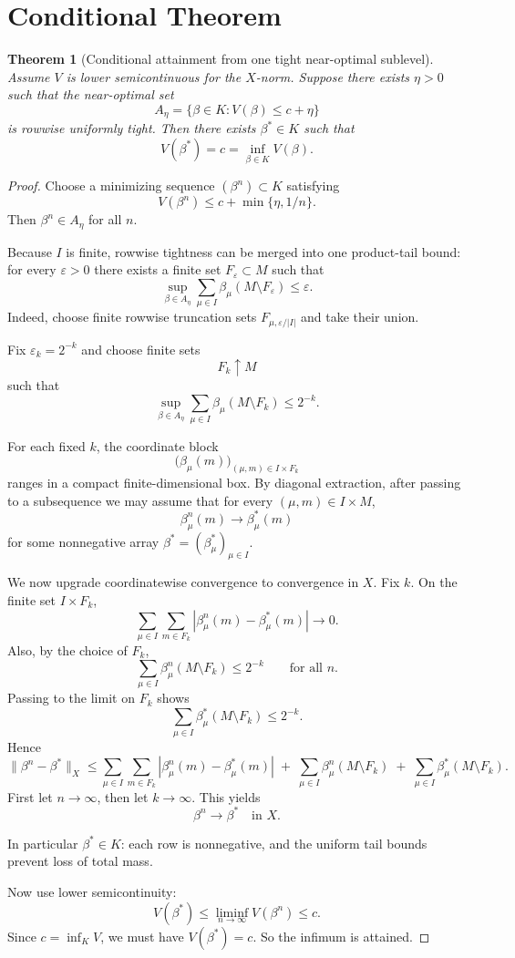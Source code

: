 \documentclass[12pt]{article}
\newtheorem{theorem}{Theorem}
\begin{document}
\section{Conditional Theorem}

\begin{theorem}[Conditional attainment from one tight near-optimal sublevel]
\label{thm:attainment}
Assume $V$ is lower semicontinuous for the $X$-norm.
Suppose there exists $\eta > 0$ such that the near-optimal set
\[
A_\eta = \{ \beta \in K : V(\beta) \le c + \eta \}
\]
is rowwise uniformly tight.
Then there exists $\beta^* \in K$ such that
\[
V(\beta^*) = c = \inf_{\beta \in K} V(\beta).
\]
\end{theorem}

\begin{proof}
Choose a minimizing sequence $(\beta^n) \subset K$ satisfying
\[
V(\beta^n) \le c + \min\{\eta, 1/n\}.
\]
Then $\beta^n \in A_\eta$ for all $n$.

Because $I$ is finite, rowwise tightness can be merged into one product-tail bound:
for every $\varepsilon > 0$ there exists a finite set $F_\varepsilon \subset M$ such that
\[
\sup_{\beta \in A_\eta} \sum_{\mu \in I} \beta_\mu(M \setminus F_\varepsilon) \le \varepsilon.
\]
Indeed, choose finite rowwise truncation sets $F_{\mu,\varepsilon/|I|}$ and take their union.

Fix $\varepsilon_k = 2^{-k}$ and choose finite sets
\[
F_k \uparrow M
\]
such that
\[
\sup_{\beta \in A_\eta} \sum_{\mu \in I} \beta_\mu(M \setminus F_k) \le 2^{-k}.
\]

For each fixed $k$, the coordinate block
\[
\big(\beta_\mu(m)\big)_{(\mu,m)\in I\times F_k}
\]
ranges in a compact finite-dimensional box.
By diagonal extraction, after passing to a subsequence we may assume that for every $(\mu,m) \in I \times M$,
\[
\beta^n_\mu(m) \to \beta^*_\mu(m)
\]
for some nonnegative array $\beta^* = (\beta^*_\mu)_{\mu \in I}$.

We now upgrade coordinatewise convergence to convergence in $X$.
Fix $k$.
On the finite set $I \times F_k$,
\[
\sum_{\mu \in I}\sum_{m \in F_k} |\beta^n_\mu(m)-\beta^*_\mu(m)| \to 0.
\]
Also, by the choice of $F_k$,
\[
\sum_{\mu \in I}\beta^n_\mu(M \setminus F_k) \le 2^{-k}
\qquad\text{for all } n.
\]
Passing to the limit on $F_k$ shows
\[
\sum_{\mu \in I}\beta^*_\mu(M \setminus F_k) \le 2^{-k}.
\]
Hence
\[
\|\beta^n-\beta^*\|_X
\le
\sum_{\mu \in I}\sum_{m \in F_k} |\beta^n_\mu(m)-\beta^*_\mu(m)|
\;+\;
\sum_{\mu \in I}\beta^n_\mu(M \setminus F_k)
\;+\;
\sum_{\mu \in I}\beta^*_\mu(M \setminus F_k).
\]
First let $n \to \infty$, then let $k \to \infty$.
This yields
\[
\beta^n \to \beta^* \quad \text{in } X.
\]

In particular $\beta^* \in K$: each row is nonnegative, and the uniform tail bounds prevent loss of total mass.

Now use lower semicontinuity:
\[
V(\beta^*) \le \liminf_{n\to\infty} V(\beta^n) \le c.
\]
Since $c = \inf_K V$, we must have $V(\beta^*) = c$.
So the infimum is attained.
\end{proof}
\end{document}
